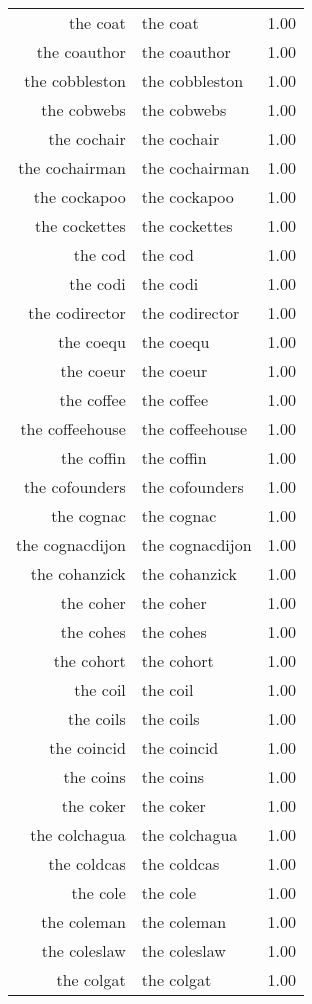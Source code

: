 \begin{table}[ht]
\begin{tabular}{rlr}
  the coat & the coat & 1.00 \\ 
  the coauthor & the coauthor & 1.00 \\ 
  the cobbleston & the cobbleston & 1.00 \\ 
  the cobwebs & the cobwebs & 1.00 \\ 
  the cochair & the cochair & 1.00 \\ 
  the cochairman & the cochairman & 1.00 \\ 
  the cockapoo & the cockapoo & 1.00 \\ 
  the cockettes & the cockettes & 1.00 \\ 
  the cod & the cod & 1.00 \\ 
  the codi & the codi & 1.00 \\ 
  the codirector & the codirector & 1.00 \\ 
  the coequ & the coequ & 1.00 \\ 
  the coeur & the coeur & 1.00 \\ 
  the coffee & the coffee & 1.00 \\ 
  the coffeehouse & the coffeehouse & 1.00 \\ 
  the coffin & the coffin & 1.00 \\ 
  the cofounders & the cofounders & 1.00 \\ 
  the cognac & the cognac & 1.00 \\ 
  the cognacdijon & the cognacdijon & 1.00 \\ 
  the cohanzick & the cohanzick & 1.00 \\ 
  the coher & the coher & 1.00 \\ 
  the cohes & the cohes & 1.00 \\ 
  the cohort & the cohort & 1.00 \\ 
  the coil & the coil & 1.00 \\ 
  the coils & the coils & 1.00 \\ 
  the coincid & the coincid & 1.00 \\ 
  the coins & the coins & 1.00 \\ 
  the coker & the coker & 1.00 \\ 
  the colchagua & the colchagua & 1.00 \\ 
  the coldcas & the coldcas & 1.00 \\ 
  the cole & the cole & 1.00 \\ 
  the coleman & the coleman & 1.00 \\ 
  the coleslaw & the coleslaw & 1.00 \\ 
  the colgat & the colgat & 1.00 \\ 

\end{tabular}
\end{table}
